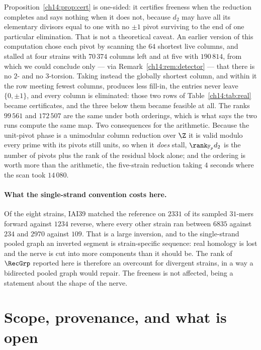 \begin{remark}\label{ch14:rem:order}
Proposition~\ref{ch14:prop:cert} is one-sided: it certifies freeness when the reduction completes
and says nothing when it does not, because $d_2$ may have all its elementary divisors equal
to one with no $\pm1$ pivot surviving to the end of one particular elimination. That is not a
theoretical caveat. An earlier version of this computation chose each pivot by scanning the
$64$ shortest live columns, and stalled at four strains with $70\,374$ columns left and at
five with $190\,814$, from which we could conclude only --- via
Remark~\ref{ch14:rem:detector} --- that there is no $2$- and no $3$-torsion. Taking instead the
globally shortest column, and within it the row meeting fewest columns, produces less fill-in,
the entries never leave $\{0,\pm1\}$, and every column is eliminated: those two rows of
Table~\ref{ch14:tab:real} became certificates, and the three below them became feasible at all.
The ranks $99\,561$ and $172\,507$ are the same
under both orderings, which is what says the two runs compute the same map. Two consequences
for the arithmetic. Because the unit-pivot phase is a unimodular column reduction over $\Z$ it
is valid modulo every prime with its pivots still units, so when it \emph{does} stall,
$\rank_{\mathbb F_p}d_2$ is the number of pivots plus the rank of the residual block alone;
and the ordering is worth more than the arithmetic, the five-strain reduction taking $4$
seconds where the scan took $14\,080$.
\end{remark}

\paragraph{What the single-strand convention costs here.} Of the eight strains, IAI39
matched the reference on $2331$ of its sampled $31$-mers forward against $1234$ reverse,
where every other strain ran between $6835$ against $234$ and $2970$ against $109$. That is a
large inversion, and to the
single-strand pooled graph an inverted segment is strain-specific sequence: real homology is
lost and the nerve is cut into more components than it should be. The rank of $\RecGrp$ reported
here is therefore an overcount for divergent strains, in a way a bidirected pooled graph
would repair. The freeness is not affected, being a statement about the shape of the nerve.

\section{Scope, provenance, and what is open}

